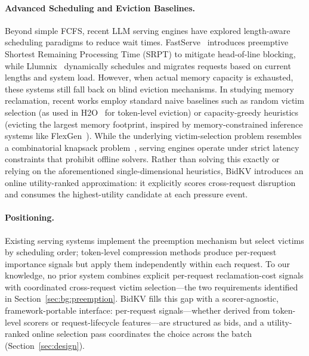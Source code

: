 \documentclass[sigconf,nonacm]{acmart}
\newcommand{\bidkv}{BidKV\xspace}
\begin{document}
\paragraph{Advanced Scheduling and Eviction Baselines.}
Beyond simple FCFS, recent LLM serving engines have explored length-aware
scheduling paradigms to reduce wait times.
FastServe~\cite{wu2023fastserve} introduces preemptive Shortest Remaining
Processing Time (SRPT) to mitigate head-of-line blocking, while
Llumnix~\cite{sun2024llumnix} dynamically schedules and migrates requests
based on current lengths and system load.
However, when actual memory capacity is exhausted, these systems still fall
back on blind eviction mechanisms.
In studying memory reclamation, recent works employ standard naive baselines
such as random victim selection (as used in H2O~\cite{Zhang2023h2o} for
token-level eviction) or capacity-greedy heuristics (evicting the largest
memory footprint, inspired by memory-constrained inference systems like
FlexGen~\cite{Sheng2023flexgen}).
While the underlying victim-selection problem resembles a combinatorial
knapsack problem~\cite{Kellerer2004, Martello1993}, serving engines operate
under strict latency constraints that prohibit offline solvers.
Rather than solving this exactly or relying on the aforementioned
single-dimensional heuristics, \bidkv introduces an online utility-ranked
approximation: it explicitly scores cross-request disruption and consumes the
highest-utility candidate at each pressure event.

\paragraph{Positioning.}
Existing serving systems implement the preemption mechanism but select victims
by scheduling order; token-level compression methods produce per-request
importance signals but apply them independently within each request.
To our knowledge, no prior system combines explicit per-request
reclamation-cost signals with coordinated cross-request victim
selection---the two requirements identified in
Section~\ref{sec:bg:preemption}.
\bidkv fills this gap with a scorer-agnostic, framework-portable interface:
per-request signals---whether derived from token-level scorers or
request-lifecycle features---are structured as bids, and a utility-ranked
online selection pass coordinates the choice across the batch
(Section~\ref{sec:design}).

\end{document}
